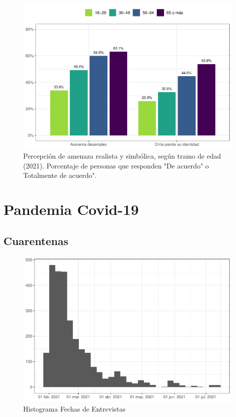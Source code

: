 \documentclass[
  12pt,
  openany]{book}
\begin{document}
\begin{figure}

{\centering \includegraphics{reporte-elsoc_files/figure-latex/amen-edad-1} 

}

\caption{Percepción de amenaza realista y simbólica, según tramo de edad (2021). Porcentaje de personas que responden "De acuerdo" o Totalmente de acuerdo".}\label{fig:amen-edad}
\end{figure}

\hypertarget{pandemia-covid-19}{%
\chapter{Pandemia Covid-19}\label{pandemia-covid-19}}

\hypertarget{cuarentenas}{%
\section{Cuarentenas}\label{cuarentenas}}

\begin{figure}

{\centering \includegraphics{reporte-elsoc_files/figure-latex/hist-fecha-2021-1} 

}

\caption{Histograma Fechas de Entrevistas}\label{fig:hist-fecha-2021}
\end{figure}
\end{document}
